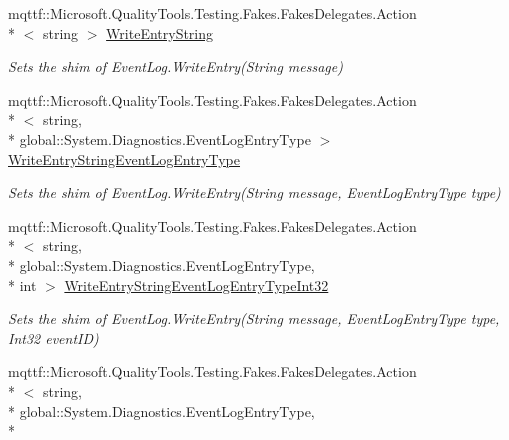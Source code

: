 \begin{DoxyCompactItemize}
mqttf\-::\-Microsoft.\-Quality\-Tools.\-Testing.\-Fakes.\-Fakes\-Delegates.\-Action\\*
$<$ string $>$ \hyperlink{class_system_1_1_diagnostics_1_1_fakes_1_1_shim_event_log_a4e60ffed460a805280b9dead3bfdcc54}{Write\-Entry\-String}
\begin{DoxyCompactList}\small\item\em Sets the shim of Event\-Log.\-Write\-Entry(\-String message)\end{DoxyCompactList}\item 
mqttf\-::\-Microsoft.\-Quality\-Tools.\-Testing.\-Fakes.\-Fakes\-Delegates.\-Action\\*
$<$ string, \\*
global\-::\-System.\-Diagnostics.\-Event\-Log\-Entry\-Type $>$ \hyperlink{class_system_1_1_diagnostics_1_1_fakes_1_1_shim_event_log_ac33a6ddb8117882662c3bf7c3236af8e}{Write\-Entry\-String\-Event\-Log\-Entry\-Type}
\begin{DoxyCompactList}\small\item\em Sets the shim of Event\-Log.\-Write\-Entry(\-String message, Event\-Log\-Entry\-Type type)\end{DoxyCompactList}\item 
mqttf\-::\-Microsoft.\-Quality\-Tools.\-Testing.\-Fakes.\-Fakes\-Delegates.\-Action\\*
$<$ string, \\*
global\-::\-System.\-Diagnostics.\-Event\-Log\-Entry\-Type, \\*
int $>$ \hyperlink{class_system_1_1_diagnostics_1_1_fakes_1_1_shim_event_log_a9d78f8df5d75276d5bc217512f8457ea}{Write\-Entry\-String\-Event\-Log\-Entry\-Type\-Int32}
\begin{DoxyCompactList}\small\item\em Sets the shim of Event\-Log.\-Write\-Entry(\-String message, Event\-Log\-Entry\-Type type, Int32 event\-I\-D)\end{DoxyCompactList}\item 
mqttf\-::\-Microsoft.\-Quality\-Tools.\-Testing.\-Fakes.\-Fakes\-Delegates.\-Action\\*
$<$ string, \\*
global\-::\-System.\-Diagnostics.\-Event\-Log\-Entry\-Type, \\*

\end{DoxyCompactItemize}
